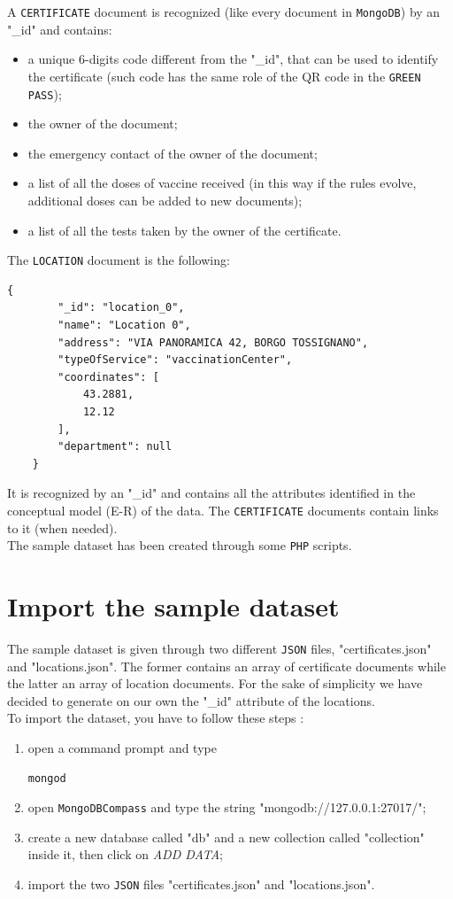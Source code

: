 \documentclass{article}
\begin{document}
\vspace{0.3cm}
A \verb|CERTIFICATE| document is recognized (like every document in \verb|MongoDB|) by an "\_id" and contains:
\begin{itemize}
    \item a unique 6-digits code different from the "\_id", that can be used to identify the certificate (such code has the same role of the QR code in the \verb|GREEN| \verb|PASS|);
    \item the owner of the document;
    \item the emergency contact of the owner of the document;
    \item a list of all the doses of vaccine received (in this way if the rules evolve, additional doses can be added to new documents);
    \item a list of all the tests taken by the owner of the certificate.
\end{itemize}
\vspace{0.3cm}
The \verb|LOCATION| document is the following:
\begin{verbatim}
{
        "_id": "location_0",
        "name": "Location 0",
        "address": "VIA PANORAMICA 42, BORGO TOSSIGNANO",
        "typeOfService": "vaccinationCenter",
        "coordinates": [
            43.2881,
            12.12
        ],
        "department": null
    }
\end{verbatim}
It is recognized by an "\_id" and contains all the attributes identified in the conceptual model (E-R) of the data. The \verb|CERTIFICATE| documents contain links to it (when needed).\\
The sample dataset has been created through some \verb|PHP| scripts.
\section{Import the sample dataset}
The sample dataset is given through two different \verb|JSON| files, "certificates.json" and "locations.json". The former contains an array of certificate documents while the latter an array of location documents. For the sake of simplicity we have decided to generate on our own the "\_id" attribute of the locations.\\
To import the dataset, you have to follow these steps :
\begin{enumerate}
    \item open a command prompt and type \begin{lstlisting}[language=bash]
    mongod
\end{lstlisting}
\item open \verb|MongoDBCompass| and type the string "mongodb://127.0.0.1:27017/";
\item create a new database called "db" and a new collection called "collection" inside it, then click on \textit{ADD DATA};
\item import the two \verb|JSON| files "certificates.json" and "locations.json".
\end{enumerate}
\end{document}
